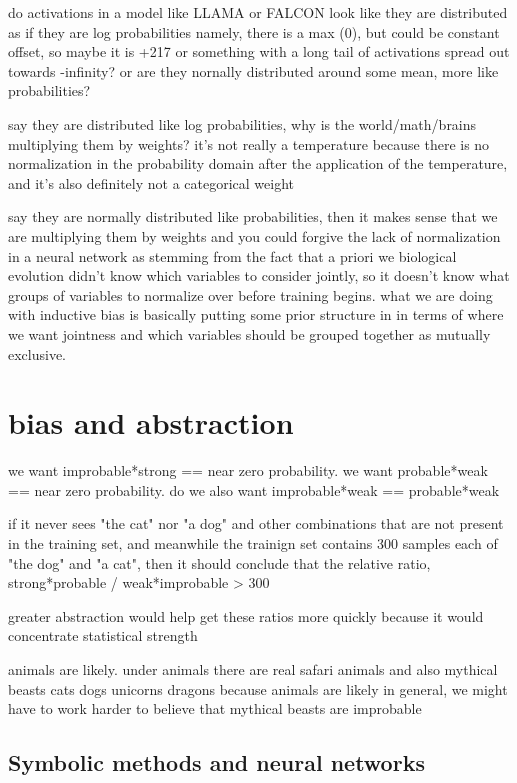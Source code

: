 do activations in a model like LLAMA or FALCON look like they are distributed as if they are log probabilities
namely, there is a max (0), but could be constant offset, so maybe it is +217 or something with 
a long tail of activations spread out towards -infinity?  or are they nornally distributed around some mean,
more like probabilities? 

say they are distributed like log probabilities, why is the world/math/brains multiplying them by weights?  it's not really a temperature because there is no normalization in the probability domain after the application
of the temperature, and it's also definitely not a categorical weight

say they are normally distributed like probabilities, then it makes sense that we are multiplying them by weights
and you could forgive the lack of normalization in a neural network as stemming from the fact that a priori we
biological evolution didn't know which variables to consider jointly, so it doesn't know what groups of variables to 
normalize over before training begins.  what we are doing with inductive bias is basically putting some prior structure in
in terms of where we want jointness and which variables should be grouped together as mutually exclusive.

\section{bias and abstraction}

we want improbable*strong == near zero probability.
we want probable*weak  == near zero probability.
do we also want improbable*weak == probable*weak

if it never sees "the cat" nor "a dog" and other combinations that are not present in the training set, and meanwhile the trainign set contains 300 samples each of "the dog" and "a cat", then it should conclude that the relative ratio, strong*probable / weak*improbable > 300

greater abstraction would help get these ratios more quickly because it would concentrate statistical strength

animals are likely. under animals there are real safari animals and also mythical beasts
cats dogs unicorns dragons
because animals are likely in general, we might have to work harder to believe that mythical beasts are improbable


\subsection{Symbolic methods and neural networks}

